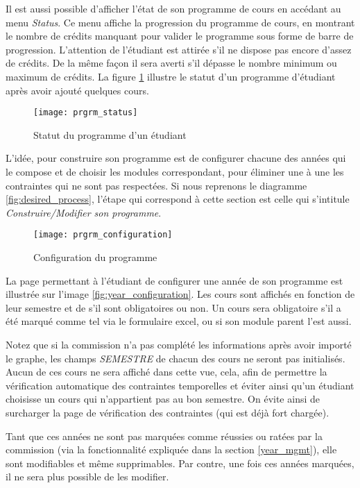 Il est aussi possible d'afficher l'état de son programme de cours en accédant au menu \textit{Status}. Ce menu affiche la progression du programme de cours, en montrant le nombre de crédits manquant pour valider le programme sous forme de barre de progression. L'attention de l'étudiant est attirée s'il ne dispose pas encore d'assez de crédits. De la même façon il sera averti s'il dépasse le nombre minimum ou maximum de crédits. La figure \ref{fig:prgrm_status} illustre le statut d'un programme d'étudiant après avoir ajouté quelques cours.

\begin{figure}
\centering
\caption{Statut du programme d'un étudiant}
\label{fig:prgrm_status}
\texttt{[image: prgrm\_status]}
\end{figure} 


L'idée, pour construire son programme est de configurer chacune des années qui le compose et de choisir les modules correspondant, pour éliminer une à une les contraintes qui ne sont pas respectées. Si nous reprenons le diagramme \ref{fig:desired_process}, l'étape qui correspond à cette section est celle qui s'intitule \textit{Construire/Modifier son programme}.



\begin{figure}
\centering
\caption{Configuration du programme}
\label{fig:program_configure}
\texttt{[image: prgrm\_configuration]}
\end{figure}

La page permettant à l'étudiant de configurer une année de son programme est illustrée sur l'image \ref{fig:year_configuration}. Les cours sont affichés en fonction de leur semestre et de s'il sont obligatoires ou non. Un cours sera obligatoire s'il a été marqué comme tel via le formulaire excel, ou si son module parent l'est aussi.

Notez que si la commission n'a pas complété les informations après avoir importé le graphe, les champs \textit{SEMESTRE} de chacun des cours ne seront pas initialisés. Aucun de ces cours ne sera affiché dans cette vue, cela, afin de permettre la vérification automatique des contraintes temporelles et éviter ainsi qu'un étudiant choisisse un cours qui n'appartient pas au bon semestre. On évite ainsi de surcharger la page de vérification des contraintes (qui est déjà fort chargée).

Tant que ces années ne sont pas marquées comme réussies ou ratées par la commission (via la fonctionnalité expliquée dans la section \ref{year_mgmt}), elle sont modifiables et même supprimables. Par contre, une fois ces années marquées, il ne sera plus possible de les modifier. 

